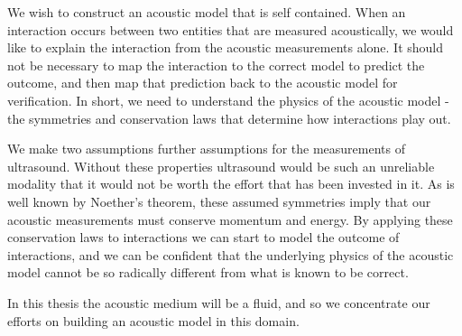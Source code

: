 We wish to construct an acoustic model that is self contained.
When an interaction occurs between two entities that are measured acoustically,
we would like to explain the interaction from the acoustic measurements alone.
It should not be necessary to map the interaction to the correct model to predict the outcome, 
and then map that prediction back to the acoustic model for verification.
In short, we need to understand the physics of the acoustic model - the symmetries and conservation laws
that determine how interactions play out.

We make two assumptions further assumptions for the measurements of ultrasound.
Without these properties ultrasound would be such an unreliable modality
that it would not be worth the effort that has been invested in it.
As is well known by Noether's theorem,
these assumed symmetries imply that our acoustic measurements must conserve momentum and energy.
By applying these conservation laws to interactions we can start to model the outcome of interactions,
and we can be confident that the underlying physics of the acoustic model 
cannot be so radically different from what is known to be correct.



In this thesis the acoustic medium will be a fluid,
and so we concentrate our efforts on building an acoustic model in this domain.



